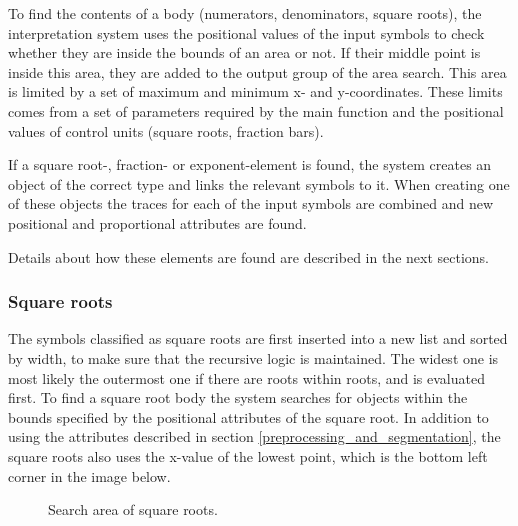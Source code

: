 To find the contents of a body (numerators, denominators, square roots), the interpretation system uses the positional values of the input symbols to check whether they are inside the bounds of an area or not. If their middle point is inside this area, they are added to the output group of the area search. This area is limited by a set of maximum and minimum x- and y-coordinates. These limits comes from a set of parameters required by the main function and the positional values of control units (square roots, fraction bars).

If a square root-, fraction- or exponent-element is found, the system creates an object of the correct type and links the relevant symbols to it. When creating one of these objects the traces for each of the input symbols are combined and new positional and proportional attributes are found.

Details about how these elements are found are described in the next sections.

\subsubsection{Square roots}
\label{interpretation-square-roots}

The symbols classified as square roots are first inserted into a new list and sorted by width, to make sure that the recursive logic is maintained. The widest one is most likely the outermost one if there are roots within roots, and is evaluated first. To find a square root body the system searches for objects within the bounds specified by the positional attributes of the square root. In addition to using the attributes described in section \ref{preprocessing_and_segmentation}, the square roots also uses the x-value of the lowest point, which is the bottom left corner in the image below.

\begin{figure}[H]
\centering
    \label{fig:interpretation}
\caption{Search area of square roots.}
\end{figure}

